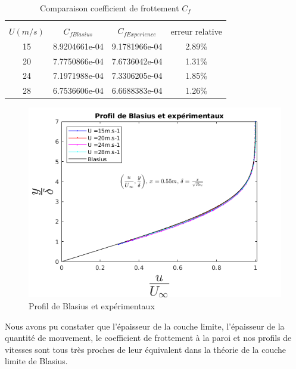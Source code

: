 \documentclass[french]{article}
\begin{document}
\begin{table}[ht]
	\centering
	\begin{tabular}{cccc}
		\hline\\
		$U(m/s)$ & $C_{fBlasius}$ &
		$ C_{fExperience}$ & 
		 erreur relative\\
		\hline
   15 & 8.9204661e-04   & 9.1781966e-04   & 2.89\%\\
   20 & 7.7750866e-04   & 7.6736042e-04   & 1.31\%\\
   24 & 7.1971988e-04   & 7.3306205e-04   & 1.85\%\\
   28 & 6.7536606e-04   & 6.6688383e-04   & 1.26\%
	\end{tabular}
	\caption{Comparaison coefficient de frottement $C_{f}$}
\end{table}
\begin{figure}[ht]
	\centering
	\includegraphics[scale = 0.6]{./image/Bla.png}
	\caption{Profil de Blasius et expérimentaux}
\end{figure}
\newpage
Nous avons pu constater que l'épaisseur de la couche limite, l'épaisseur de la quantité de mouvement, le coefficient de frottement à la paroi et nos profils de vitesses sont tous très proches de leur équivalent dans la théorie de la couche limite de Blasius.
\end{document}
